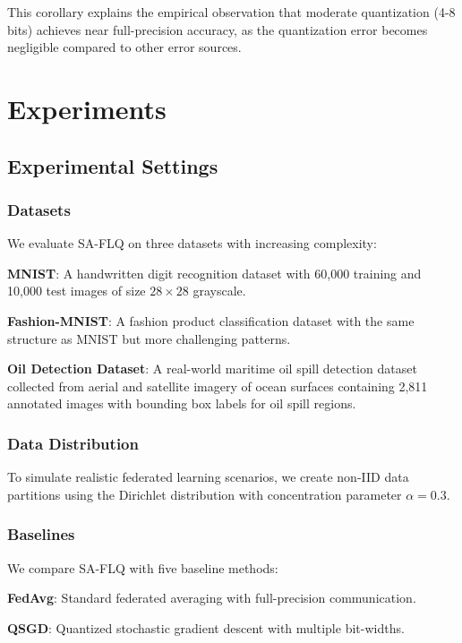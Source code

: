 \documentclass[journal]{IEEEtran}
\begin{document}
This corollary explains the empirical observation that moderate quantization (4-8 bits) achieves near full-precision accuracy, as the quantization error becomes negligible compared to other error sources.

\section{Experiments}
\label{sec:experiments}

\subsection{Experimental Settings}

\subsubsection{Datasets}
We evaluate SA-FLQ on three datasets with increasing complexity:

\textbf{MNIST}: A handwritten digit recognition dataset with 60,000 training and 10,000 test images of size $28 \times 28$ grayscale.

\textbf{Fashion-MNIST}: A fashion product classification dataset with the same structure as MNIST but more challenging patterns.

\textbf{Oil Detection Dataset}: A real-world maritime oil spill detection dataset collected from aerial and satellite imagery of ocean surfaces containing 2,811 annotated images with bounding box labels for oil spill regions.

\subsubsection{Data Distribution}
To simulate realistic federated learning scenarios, we create non-IID data partitions using the Dirichlet distribution with concentration parameter $\alpha = 0.3$.

\subsubsection{Baselines}
We compare SA-FLQ with five baseline methods:

\textbf{FedAvg}: Standard federated averaging with full-precision communication.

\textbf{QSGD}: Quantized stochastic gradient descent with multiple bit-widths.
\end{document}
